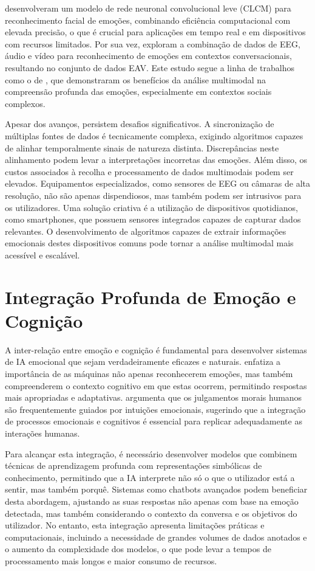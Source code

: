 \documentclass[a4paper,12pt]{report}
\begin{document}
	\textcite{gursesli2024} desenvolveram um modelo de rede neuronal convolucional leve (CLCM) para reconhecimento facial de emoções, combinando eficiência computacional com elevada precisão, o que é crucial para aplicações em tempo real e em dispositivos com recursos limitados. Por sua vez, \textcite{lee2024} exploram a combinação de dados de EEG, áudio e vídeo para reconhecimento de emoções em contextos conversacionais, resultando no conjunto de dados EAV. Este estudo segue a linha de trabalhos como o de \textcite{poria2015}, que demonstraram os benefícios da análise multimodal na compreensão profunda das emoções, especialmente em contextos sociais complexos.
	
	Apesar dos avanços, persistem desafios significativos. A sincronização de múltiplas fontes de dados é tecnicamente complexa, exigindo algoritmos capazes de alinhar temporalmente sinais de natureza distinta. Discrepâncias neste alinhamento podem levar a interpretações incorretas das emoções. Além disso, os custos associados à recolha e processamento de dados multimodais podem ser elevados. Equipamentos especializados, como sensores de EEG ou câmaras de alta resolução, não são apenas dispendiosos, mas também podem ser intrusivos para os utilizadores. Uma solução criativa é a utilização de dispositivos quotidianos, como smartphones, que possuem sensores integrados capazes de capturar dados relevantes. O desenvolvimento de algoritmos capazes de extrair informações emocionais destes dispositivos comuns pode tornar a análise multimodal mais acessível e escalável.
	
	\section{Integração Profunda de Emoção e Cognição}
	
	A inter-relação entre emoção e cognição é fundamental para desenvolver sistemas de IA emocional que sejam verdadeiramente eficazes e naturais. \textcite{picard1997} enfatiza a importância de as máquinas não apenas reconhecerem emoções, mas também compreenderem o contexto cognitivo em que estas ocorrem, permitindo respostas mais apropriadas e adaptativas. \textcite{haidt2001} argumenta que os julgamentos morais humanos são frequentemente guiados por intuições emocionais, sugerindo que a integração de processos emocionais e cognitivos é essencial para replicar adequadamente as interações humanas.
	
	Para alcançar esta integração, é necessário desenvolver modelos que combinem técnicas de aprendizagem profunda com representações simbólicas de conhecimento, permitindo que a IA interprete não só o que o utilizador está a sentir, mas também porquê. Sistemas como chatbots avançados podem beneficiar desta abordagem, ajustando as suas respostas não apenas com base na emoção detectada, mas também considerando o contexto da conversa e os objetivos do utilizador. No entanto, esta integração apresenta limitações práticas e computacionais, incluindo a necessidade de grandes volumes de dados anotados e o aumento da complexidade dos modelos, o que pode levar a tempos de processamento mais longos e maior consumo de recursos.
	
\end{document}
